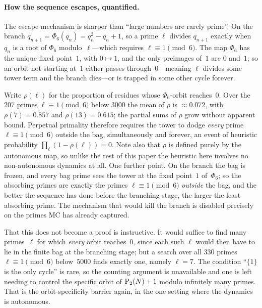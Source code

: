 \paragraph{How the sequence escapes, quantified.}
The escape mechanism is sharper than ``large numbers are rarely prime''.
On the branch $q_{n+1} = \Phi_6(q_n) = q_n^2 - q_n + 1$, so a prime
$\ell$ divides $q_{n+1}$ exactly when $q_n$ is a root of $\Phi_6$
modulo~$\ell$---which requires $\ell \equiv 1 \pmod 6$.  The map $\Phi_6$
has the unique fixed point~$1$, with $0 \mapsto 1$, and the only
preimages of~$1$ are $0$ and~$1$; so an orbit not starting at~$1$ either
passes through~$0$---meaning $\ell$ divides some tower term and the
branch dies---or is trapped in some other cycle forever.

Write $\rho(\ell)$ for the proportion of residues whose $\Phi_6$-orbit
reaches~$0$.  Over the $207$ primes $\ell \equiv 1 \pmod 6$ below $3000$
the mean of $\rho$ is $\approx 0.072$, with $\rho(7) = 0.857$ and
$\rho(13) = 0.615$; the partial sums of $\rho$ grow without apparent
bound.  Perpetual primality therefore requires the tower to dodge
\emph{every} prime $\ell \equiv 1 \pmod 6$ outside the bag,
simultaneously and forever, an event of heuristic probability
$\prod_\ell (1-\rho(\ell)) = 0$.  Note also that $\rho$ is defined
purely by the autonomous map, so unlike the rest of this paper the
heuristic here involves no non-autonomous dynamics at all.  One further
point.  On the branch the bag is frozen, and every bag prime sees the
tower at the fixed point~$1$ of~$\Phi_6$; so the absorbing primes are
exactly the primes $\ell \equiv 1 \pmod 6$ \emph{outside} the bag, and
the better the sequence has done before the branching stage, the larger
the least absorbing prime.  The mechanism that would kill the branch is
disabled precisely on the primes MC has already captured.

\smallskip\noindent
That this does not become a proof is instructive.  It would suffice to
find many primes~$\ell$ for which \emph{every} orbit reaches~$0$, since
each such $\ell$ would then have to lie in the finite bag at the
branching stage; but a search over all $330$ primes $\ell \equiv 1
\pmod 6$ below~$5000$ finds exactly one, namely $\ell = 7$.  The
condition ``$\{1\}$ is the only cycle'' is rare, so the counting argument
is unavailable and one is left needing to control the specific orbit of
$\mathrm{P}_{2}(N)+1$ modulo infinitely many primes.  That is the
orbit-specificity barrier again, in the one setting where the dynamics is
autonomous.

